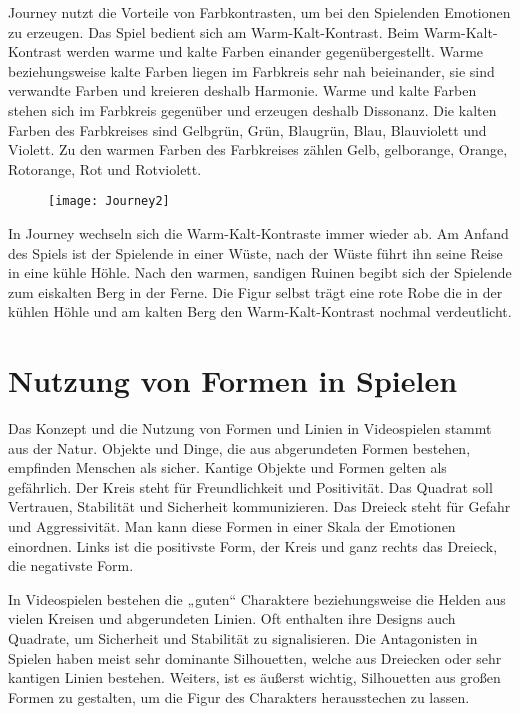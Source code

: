 Journey nutzt die Vorteile von Farbkontrasten, um bei den Spielenden Emotionen zu erzeugen. Das Spiel bedient sich am Warm-Kalt-Kontrast. Beim Warm-Kalt-Kontrast werden warme und kalte Farben einander gegenübergestellt. Warme beziehungsweise kalte Farben liegen im Farbkreis sehr nah beieinander, sie sind verwandte Farben und kreieren deshalb Harmonie. Warme und kalte Farben stehen sich im Farbkreis gegenüber und erzeugen deshalb Dissonanz. Die kalten Farben des Farbkreises sind Gelbgrün, Grün, Blaugrün, Blau, Blauviolett und Violett. Zu den warmen Farben des Farbkreises zählen Gelb, gelborange, Orange, Rotorange, Rot und Rotviolett.
\cite{solarski2012drawing}

\begin{figure}[H]
	\centering
	\texttt{[image: Journey2]}
	\caption{\cite{solarski2012drawing}}
\end{figure}

In Journey wechseln sich die Warm-Kalt-Kontraste immer wieder ab. Am Anfand des Spiels ist der Spielende in einer Wüste, nach der Wüste führt ihn seine Reise in eine kühle Höhle. Nach den warmen, sandigen Ruinen begibt sich der Spielende zum eiskalten Berg in der Ferne. Die Figur selbst trägt eine rote Robe die in der kühlen Höhle und am kalten Berg den Warm-Kalt-Kontrast nochmal verdeutlicht.
\cite{solarski2012drawing}


\section{Nutzung von Formen in Spielen}
Das Konzept und die Nutzung von Formen und Linien in Videospielen stammt aus der Natur. Objekte und Dinge, die aus abgerundeten Formen bestehen, empfinden Menschen als sicher. Kantige Objekte und Formen gelten als gefährlich. Der Kreis steht für Freundlichkeit und Positivität. Das Quadrat soll Vertrauen, Stabilität und Sicherheit kommunizieren. Das Dreieck steht für Gefahr und Aggressivität. Man kann diese Formen in einer Skala der Emotionen einordnen. Links ist die positivste Form, der Kreis und ganz rechts das Dreieck, die negativste Form.
\cite{solarski2012drawing}

In Videospielen bestehen die „guten“ Charaktere beziehungsweise die Helden aus vielen Kreisen und abgerundeten Linien. Oft enthalten ihre Designs auch Quadrate, um Sicherheit und Stabilität zu signalisieren. Die Antagonisten in Spielen haben meist sehr dominante Silhouetten, welche aus Dreiecken oder sehr kantigen Linien bestehen. Weiters, ist es äußerst wichtig, Silhouetten aus großen Formen zu gestalten, um die Figur des Charakters herausstechen zu lassen.
\cite{solarski2012drawing}

